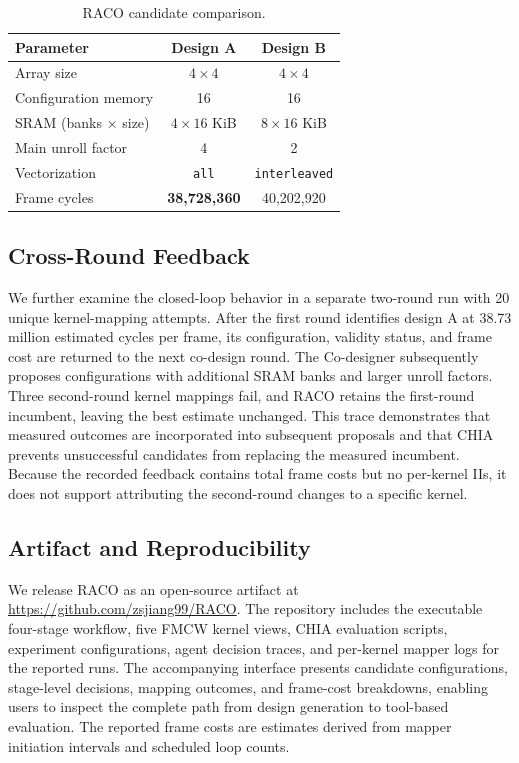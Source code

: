 \documentclass[conference,letterpaper]{IEEEtran}
\begin{document}
\begin{table}[t]
\centering
\small
\renewcommand{\arraystretch}{1.05}
\begin{tabular*}{\columnwidth}{@{\extracolsep{\fill}}lcc@{}}
\toprule
Parameter & Design A & Design B \tabularnewline
\midrule
Array size & \(4\times4\) & \(4\times4\) \tabularnewline
Configuration memory & 16 & 16 \tabularnewline
SRAM (banks \(\times\) size)
    & \(4\times16\) KiB
    & \(8\times16\) KiB \tabularnewline
Main unroll factor & 4 & 2 \tabularnewline
Vectorization
    & \texttt{all}
    & \texttt{interleaved} \tabularnewline
\midrule
Frame cycles
    & \textbf{38,728,360}
    & 40,202,920 \tabularnewline
\bottomrule
\end{tabular*}
\vspace{3pt}
\caption{RACO candidate comparison.}
\label{tab:candidates}
\end{table}

\subsection{Cross-Round Feedback}

We further examine the closed-loop behavior in a separate two-round run with 20 unique kernel-mapping attempts. After the first round identifies design A at 38.73 million estimated cycles per frame, its configuration, validity status, and frame cost are returned to the next co-design round. The Co-designer subsequently proposes configurations with additional SRAM banks and larger unroll factors. Three second-round kernel mappings fail, and RACO retains the first-round incumbent, leaving the best estimate unchanged. This trace demonstrates that measured outcomes are incorporated into subsequent proposals and that CHIA prevents unsuccessful candidates from replacing the measured incumbent. Because the recorded feedback contains total frame costs but no per-kernel IIs, it does not support attributing the second-round changes to a specific kernel.


\subsection{Artifact and Reproducibility}

We release RACO as an open-source artifact at \url{https://github.com/zsjiang99/RACO}. The repository includes the executable four-stage workflow, five FMCW kernel views, CHIA evaluation scripts, experiment configurations, agent decision traces, and per-kernel mapper logs for the reported runs. The accompanying interface presents candidate configurations, stage-level decisions, mapping outcomes, and frame-cost breakdowns, enabling users to inspect the complete path from design generation to tool-based evaluation. The reported frame costs are estimates derived from mapper initiation intervals and scheduled loop counts.
\end{document}
